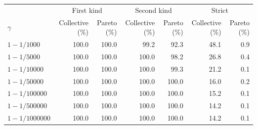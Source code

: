 \begin{tabular}{l|rr|rr|rr}
 & \multicolumn{2}{c|}{First kind} & \multicolumn{2}{c|}{Second kind} & \multicolumn{2}{c}{Strict} \\
$\gamma$ & Collective (\%) & Pareto (\%) & Collective (\%) & Pareto (\%) & Collective (\%) & Pareto (\%) \\
 \hline
$1-1/1000$ & 100.0 & 100.0 & 99.2 & 92.3 & 48.1 & 0.9 \\
$1-1/5000$ & 100.0 & 100.0 & 100.0 & 98.2 & 26.8 & 0.4 \\
$1-1/10000$ & 100.0 & 100.0 & 100.0 & 99.3 & 21.2 & 0.1 \\
$1-1/50000$ & 100.0 & 100.0 & 100.0 & 100.0 & 16.0 & 0.2 \\
$1-1/100000$ & 100.0 & 100.0 & 100.0 & 100.0 & 15.2 & 0.1 \\
$1-1/500000$ & 100.0 & 100.0 & 100.0 & 100.0 & 14.2 & 0.1 \\
$1-1/1000000$ & 100.0 & 100.0 & 100.0 & 100.0 & 14.2 & 0.1 \\
\end{tabular}
